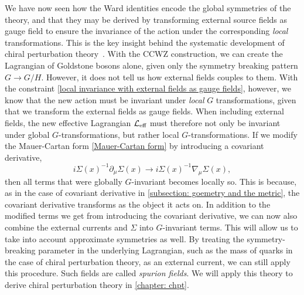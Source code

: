 We have now seen how the Ward identities encode the global symmetries of the theory, and that they may be derived by transforming external source fields as gauge field to ensure the invariance of the action under the corresponding \emph{local} transformations.
This is the key insight behind the systematic development of chiral perturbation theory~\autocite{gasserChiralPerturbationTheory1984,gasserChiralPerturbationTheory1985,leutwylerFoundationsChiralPerturbation1994}.
With the CCWZ construction, we can create the Lagrangian of Goldstone bosons alone, given only the symmetry breaking pattern $G \rightarrow G/H$.
However, it does not tell us how external fields couples to them.
With the constraint \autoref{local invariance with external fields as gauge fields}, however, we know that the new action must be invariant under \emph{local} $G$ transformations, given that we transform the external fields as gauge fields.
When including external fields, the new effective Lagrangian $\mathcal{L}_\text{eff}$ must therefore not only be invariant under global $G$-transformations, but rather local $G$-transformations.
If we modify the Mauer-Cartan form \autoref{Mauer-Cartan form} by introducing a covariant derivative,
%
\begin{equation}
    i\Sigma(x)^{-1} \partial_\mu \Sigma(x)
    \rightarrow i\Sigma(x)^{-1} \nabla_\mu \Sigma(x),
\end{equation}
%
then all terms that were globally $G$-invariant becomes locally so.
This is because, as in the case of covariant derivative in \autoref{subsection: goemetry and the metric}, the covariant derivative transforms as the object it acts on.
In addition to the modified terms we get from introducing the covariant derivative, we can now also combine the external currents and $\Sigma$ into $G$-invariant terms.
This will allow us to take into account approximate symmetries as well.
By treating the symmetry-breaking parameter in the underlying Lagrangian, such as the mass of quarks in the case of chiral perturbation theory, as an external current, we can still apply this procedure.
Such fields are called \emph{spurion fields}.
We will apply this theory to derive chiral perturbation theory in \autoref{chapter: chpt}.

